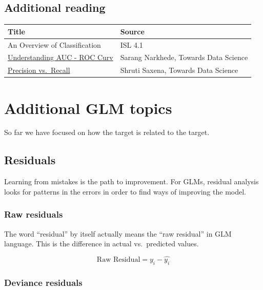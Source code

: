 \documentclass[
  openany]{book}
\begin{document}
\hypertarget{additional-reading}{%
\section{Additional reading}\label{additional-reading}}

\begin{longtable}[]{@{}ll@{}}
\toprule
Title & Source\tabularnewline
\midrule
\endhead
An Overview of Classification & ISL 4.1\tabularnewline
\href{https://towardsdatascience.com/understanding-auc-roc-curve-68b2303cc9c5\#:~:targetText=What\%20is\%20AUC\%20\%2D\%20ROC\%20Curve\%3F,capable\%20of\%20distinguishing\%20between\%20classes.}{Understanding AUC - ROC Curv} & Sarang Narkhede, Towards Data Science\tabularnewline
\href{https://towardsdatascience.com/precision-vs-recall-386cf9f89488\#:~:targetText=Precision\%20and\%20recall\%20are\%20two,correctly\%20classified\%20by\%20your\%20algorithm.}{Precision vs.~Recall} & Shruti Saxena, Towards Data Science\tabularnewline
\bottomrule
\end{longtable}

\hypertarget{additional-glm-topics}{%
\chapter{Additional GLM topics}\label{additional-glm-topics}}

So far we have focused on how the target is related to the target.

\hypertarget{residuals}{%
\section{Residuals}\label{residuals}}

Learning from mistakes is the path to improvement. For GLMs, residual analysis looks for patterns in the errors in order to find ways of improving the model.

\hypertarget{raw-residuals}{%
\subsection{Raw residuals}\label{raw-residuals}}

The word ``residual'' by itself actually means the ``raw residual'' in GLM language. This is the difference in actual vs.~predicted values.

\[\text{Raw Residual} = y_i - \hat{y_i}\]

\hypertarget{deviance-residuals}{%
\subsection{Deviance residuals}\label{deviance-residuals}}
\end{document}
